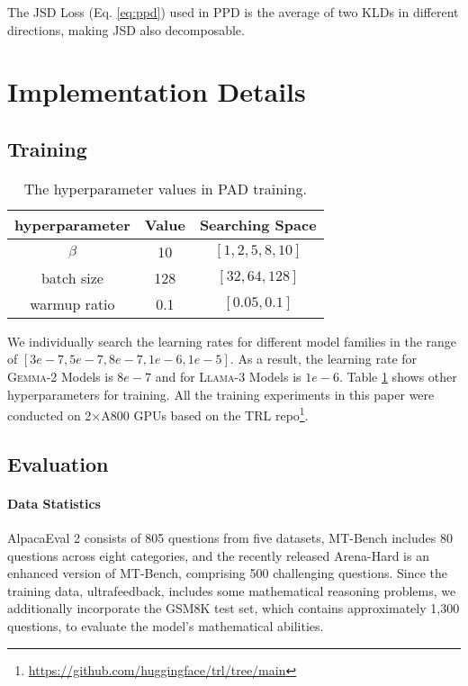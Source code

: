 The JSD Loss (Eq. \ref{eq:ppd}) used in PPD is the average of two KLDs in different directions, making JSD also decomposable.











\section{Implementation Details}
\label{app:inplement}

\subsection{Training}
\label{app:train}

\begin{table}[!tp]
\small
\centering
\setlength{\tabcolsep}{1.3em}
\renewcommand{\arraystretch}{1.3}
\begin{tabular}{ccc}
\hline
\textbf{hyperparameter} & \textbf{Value} & \textbf{Searching Space} \\ \hline
$\beta$ & 10 & $[1, 2, 5, 8, 10]$  \\ 
batch size & 128 &  $[32, 64, 128]$  \\ 
warmup ratio & 0.1 &  $[0.05, 0.1]$  \\ 
\hline
\end{tabular}
\caption{The hyperparameter values in PAD training.}
\label{tab:hyper}
\end{table}
We individually search the learning rates for different model families in the range of $ [3e-7, 5e-7, 8e-7, 1e-6, 1e-5]$. As a result, the learning rate for \textsc{Gemma-2} Models is $8e-7$ and for \textsc{Llama-3} Models is $1e-6$. Table \ref{tab:hyper} shows other hyperparameters for training.
All the training experiments in this paper were conducted on 2×A800 GPUs based on the TRL repo\footnote{\url{https://github.com/huggingface/trl/tree/main}}.

\subsection{Evaluation}
\label{app:eval}
\paragraph{Data Statistics}
AlpacaEval 2 consists of 805 questions from five datasets, MT-Bench includes 80 questions across eight categories, and the recently released Arena-Hard is an enhanced version of MT-Bench, comprising 500 challenging questions. Since the training data, ultrafeedback, includes some mathematical reasoning problems, we additionally incorporate the GSM8K test set, which contains approximately 1,300 questions, to evaluate the model's mathematical abilities.

